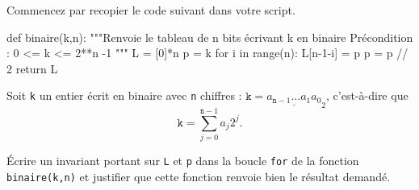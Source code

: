 Commencez par recopier le code suivant dans votre script. 

\begin{pyverbatim}
def binaire(k,n):
    """Renvoie le tableau de n bits écrivant k en binaire
    Précondition : 0 <= k <= 2**n -1 """
    L = [0]*n
    p = k
    for i in range(n):
        L[n-1-i] = p %
        p = p // 2
    return L
\end{pyverbatim}



Soit \texttt{k} un entier écrit en binaire avec \texttt{n} chiffres : $\texttt{k} = \underline{a_{\texttt{n}-1}\ldots a_{1}a_{0}}_{2}$, c'est-à-dire que 
\begin{equation*}
  \texttt{k} = \sum_{j=0}^{\texttt{n}-1} a_j 2^j.
\end{equation*}



\question{} Écrire un invariant portant sur \texttt{L} et \texttt{p} dans la boucle \texttt{for} de la fonction \texttt{binaire(k,n)} et justifier que cette fonction renvoie bien le résultat demandé.